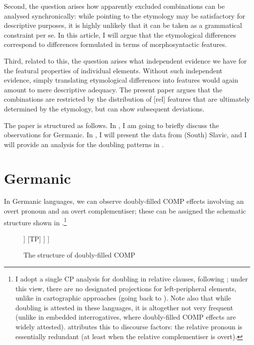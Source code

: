\documentclass[output=paper]{langscibook}
\begin{document}
Second, the question arises how apparently excluded combinations can be analysed synchronically: while pointing to the etymology may be satisfactory for descriptive purposes, it is highly unlikely that it can be taken as a grammatical constraint per se. In this article, I will argue that the etymological differences correspond to differences formulated in terms of morphosyntactic features.

Third, related to this, the question arises what independent evidence we have for the featural properties of individual elements. Without such independent evidence, simply translating etymological differences into features would again amount to mere descriptive adequacy. The present paper argues that the combinations are restricted by the distribution of [rel] features that are ultimately determined by the etymology, but can show subsequent deviations.

The paper is structured as follows. In , I am going to briefly discuss the observations for Germanic. In , I will present the data from (South) Slavic, and I will provide an analysis for the doubling patterns in .

\section{Germanic} \label{bacsk:sec:germanic}
In Germanic languages, we can observe doubly-filled COMP effects involving an overt pronoun and an overt complementiser; these can be assigned the schematic structure shown in .\footnote{I adopt a single CP analysis for doubling in relative clauses, following \citet{bacskaiatkari2020jcgl}; under this view, there are no designated projections for left-peripheral elements, unlike in cartographic approaches (going back to \citealt{rizzi1997}). Note also that while doubling is attested in these languages, it is altogether not very frequent (unlike in embedded interrogatives, where doubly-filled COMP effects are widely attested). \citet{bacskaiatkari2022jb} attributes this to discourse factors: the relative pronoun is essentially redundant (at least when the relative complementiser is overt).}

\begin{figure} 
\caption{The structure of doubly-filled COMP}
\label{bacsk:fig:structure}
\begin{forest}
[CP
	[which]
	[C$'$
		[C
			[that]
		]
		[TP]
	]
]
\end{forest}
\end{figure}
\end{document}
